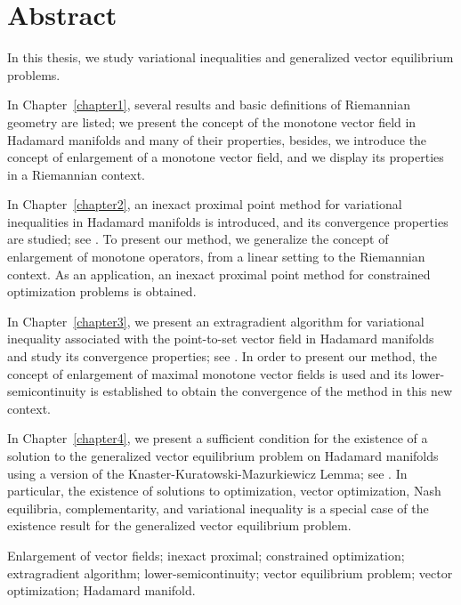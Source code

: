 
\chapter*{Abstract}

In this thesis, we study variational inequalities and generalized vector equilibrium problems.

In Chapter~\ref{chapter1}, several results and basic definitions of Riemannian geometry are listed; we present the concept of the monotone vector field in Hadamard manifolds and many of their properties, besides, we introduce the concept of enlargement of a monotone vector field, and we display its properties in a Riemannian context.
\medskip

In Chapter~\ref{chapter2}, an inexact proximal point method for variational inequalities in  Hadamard manifolds is introduced, and its convergence properties are studied; see \cite{BatistaBentoFerreira2015_2}. To present our method,  we generalize the concept of enlargement of monotone operators,  from a linear setting to the Riemannian context. As an application,  an inexact proximal point method for  constrained optimization problems is obtained.
\medskip

In Chapter~\ref{chapter3}, we present an extragradient algorithm for variational inequality  associated with the point-to-set vector field in Hadamard manifolds and study its convergence properties; see \cite{BatistaBentoFerreira2015_3}.  In order to present our method, the concept of enlargement of maximal monotone vector fields is used and its lower-semicontinuity is established to obtain the convergence of the method in this new context.
\medskip

In Chapter~\ref{chapter4}, we present a sufficient condition for the existence of a solution to the generalized vector equilibrium problem on Hadamard manifolds using a version of the Knaster-Kuratowski-Mazurkiewicz Lemma; see \cite{BatistaBentoFerreira2015}. In particular,   the existence of solutions to optimization, vector optimization, Nash equilibria, complementarity,  and variational inequality is a special case of the existence result for the generalized vector equilibrium problem.

\medskip\bigskip

 Enlargement of vector fields; inexact proximal; constrained optimization; extragradient algorithm; lower-semicontinuity; vector equilibrium problem; vector optimization; Hadamard manifold.

\newpage